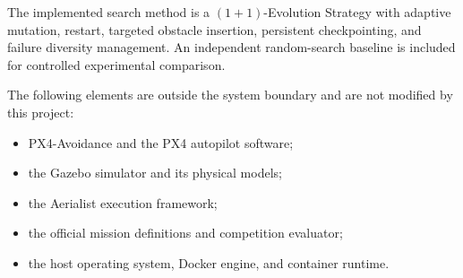 \documentclass[11pt,a4paper,openany]{report}
\begin{document}
The implemented search method is a $(1+1)$-Evolution Strategy with adaptive mutation, restart, targeted obstacle insertion, persistent checkpointing, and failure diversity management. An independent random-search baseline is included for controlled experimental comparison.

The following elements are outside the system boundary and are not modified by this project:
\begin{itemize}
  \item PX4-Avoidance and the PX4 autopilot software;
  \item the Gazebo simulator and its physical models;
  \item the Aerialist execution framework;
  \item the official mission definitions and competition evaluator;
  \item the host operating system, Docker engine, and container runtime.
\end{itemize}
\end{document}
